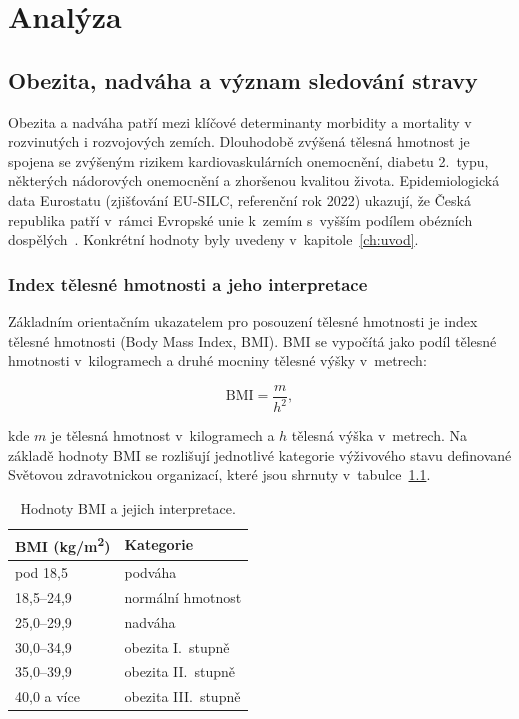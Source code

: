 \chapter{Analýza}
\label{ch:analyza}

\section{Obezita, nadváha a význam sledování stravy}
\label{sec:obezita}

Obezita a nadváha patří mezi klíčové determinanty morbidity a mortality v rozvinutých i rozvojových zemích.
Dlouhodobě zvýšená tělesná hmotnost je spojena se zvýšeným rizikem kardiovaskulárních onemocnění, diabetu 2.~typu, některých nádorových onemocnění a zhoršenou kvalitou života.
Epidemiologická data Eurostatu (zjišťování EU-SILC, referenční rok 2022) ukazují, že Česká republika patří v~rámci Evropské unie k~zemím s~vyšším podílem obézních dospělých~\cite{eurostatBmi2022}.
Konkrétní hodnoty byly uvedeny v~kapitole~\ref{ch:uvod}.

\subsection{Index tělesné hmotnosti a jeho interpretace}
\label{subsec:bmi}

Základním orientačním ukazatelem pro posouzení tělesné hmotnosti je index tělesné hmotnosti (Body Mass Index, BMI).
BMI se vypočítá jako podíl tělesné hmotnosti v~kilogramech a druhé mocniny tělesné výšky v~metrech:

\begin{equation}
	\mathrm{BMI} = \frac{m}{h^{2}},
	\label{eq:bmi}
\end{equation}

\noindent kde $m$ je tělesná hmotnost v~kilogramech a $h$ tělesná výška v~metrech.
Na základě hodnoty BMI se rozlišují jednotlivé kategorie výživového stavu definované Světovou zdravotnickou organizací, které jsou shrnuty v~tabulce~\ref{tab:bmi}.

\begin{table}[ht]
	\centering
	\caption{Hodnoty BMI a jejich interpretace.}
	\label{tab:bmi}
	\begin{tabular}{ll}
		\toprule
		\textbf{BMI (kg/m\textsuperscript{2})} & \textbf{Kategorie} \\
		\midrule
		pod 18,5 & podváha \\
		18,5--24,9 & normální hmotnost \\
		25,0--29,9 & nadváha \\
		30,0--34,9 & obezita I.~stupně \\
		35,0--39,9 & obezita II.~stupně \\
		40,0 a více & obezita III.~stupně \\
		\bottomrule
	\end{tabular}
\end{table}

